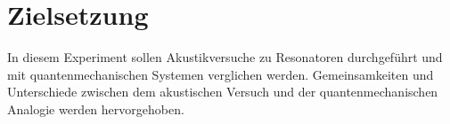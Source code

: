 \section{Zielsetzung}
\label{sec:Zielsetzung}

In diesem Experiment sollen Akustikversuche zu Resonatoren durchgeführt 
und mit quantenmechanischen Systemen verglichen werden. Gemeinsamkeiten und 
Unterschiede zwischen dem akustischen Versuch und der quantenmechanischen 
Analogie werden hervorgehoben.